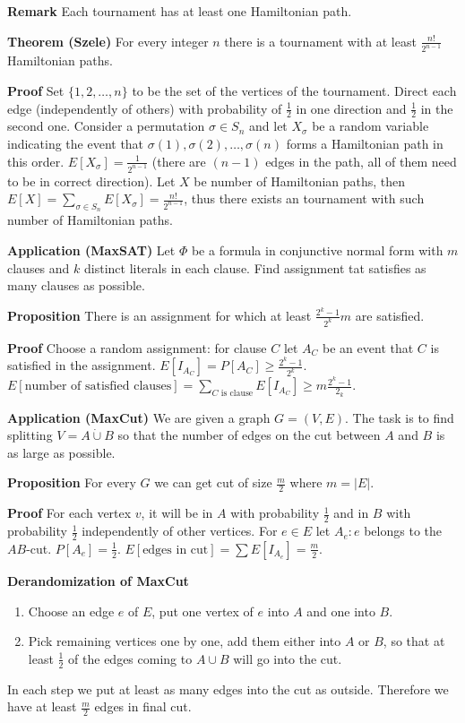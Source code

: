 \documentclass[a4paper]{article}
\begin{document}
\textbf{Remark}
Each tournament has at least one Hamiltonian path.

\textbf{Theorem (Szele)}
For every integer $n$ there is a tournament with at least $\frac{n!}{2^{n-1}}$ Hamiltonian paths.

\textbf{Proof}
Set $\{1, 2, \ldots, n\}$ to be the set of the vertices of the tournament.
Direct each edge (independently of others) with probability of $\frac{1}{2}$ in one direction and $\frac{1}{2}$ in the second one.
Consider a permutation $\sigma \in S_n$ and let $X_\sigma$ be a random variable indicating the event that $\sigma(1), \sigma(2), \ldots, \sigma(n)$ forms a Hamiltonian path in this order.
$E[X_\sigma] = \frac{1}{2^{n-1}}$ (there are $(n-1)$ edges in the path, all of them need to be in correct direction).
Let $X$ be number of Hamiltonian paths, then $E[X] = \sum_{\sigma \in S_n} E[X_\sigma] = \frac{n!}{2^{n-1}}$, thus there exists an tournament with such number of Hamiltonian paths.

\textbf{Application (MaxSAT)}
Let $\Phi$ be a formula in conjunctive normal form with $m$ clauses and $k$ distinct literals in each clause.
Find assignment tat satisfies as many clauses as possible.

\textbf{Proposition}
There is an assignment for which at least $\frac{2^k - 1}{2^k} m$ are satisfied.

\textbf{Proof}
Choose a random assignment: for clause $C$ let $A_C$ be an event that $C$ is satisfied in the assignment.
$E[I_{A_C}] = P[A_C] \geq \frac{2^k - 1}{2^k}$.
$E[\text{number of satisfied clauses}] = \sum_{C\text{ is clause}} E[I_{A_C}] \geq m \frac{2^k - 1}{2_k}$.

\textbf{Application (MaxCut)}
We are given a graph $G = (V,E)$. The task is to find splitting $V = A \dot\cup B$ so that the number of edges on the cut between $A$ and $B$ is as large as possible.

\textbf{Proposition}
For every $G$ we can get cut of size $\frac{m}{2}$ where $m = |E|$.

\textbf{Proof}
For each vertex $v$, it will be in $A$ with probability $\frac{1}{2}$ and in $B$ with probability $\frac{1}{2}$ independently of other vertices.
For $e \in E$ let $A_e: e$ belongs to the $AB$-cut.
$P[A_e] = \frac{1}{2}$.
$E[\text{edges in cut}] = \sum E[I_{A_e}] = \frac{m}{2}$.

\textbf{Derandomization of MaxCut}
\begin{enumerate}
	\item Choose an edge $e$ of $E$, put one vertex of $e$ into $A$ and one into $B$.
	\item Pick remaining vertices one by one, add them either into $A$ or $B$, so that at least $\frac{1}{2}$ of the edges coming to $A \cup B$ will go into the cut.
\end{enumerate}
In each step we put at least as many edges into the cut as outside.
Therefore we have at least $\frac{m}{2}$ edges in final cut.
\end{document}
